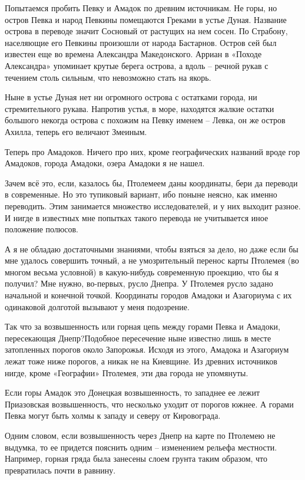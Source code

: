 Попытаемся пробить Певку и Амадок по древним источникам. Не горы, но остров Певка и народ Певкины помещаются Греками в устье Дуная. Название острова в переводе значит Сосновый от растущих на нем сосен. По Страбону, населяющие его Певкины произошли от народа Бастарнов. Остров сей был известен еще во времена Александра Македонского. Арриан в «Походе Александра» упоминает крутые берега острова, а вдоль – речной рукав с течением столь сильным, что невозможно стать на якорь.

Ныне в устье Дуная нет ни огромного острова с остатками города, ни стремительного рукава. Напротив устья, в море, находятся жалкие остатки большого некогда острова с похожим на Певку именем – Левка, он же остров Ахилла, теперь его величают Змеиным.

Теперь про Амадоков. Ничего про них, кроме географических названий вроде гор Амадоков, города Амадоки, озера Амадоки я не нашел.

Зачем всё это, если, казалось бы, Птолемеем даны координаты, бери да переводи в современные. Но это тупиковый вариант, ибо поныне неясно, как именно переводить. Этим занимается множество исследователей, и у них выходит разное. И нигде в известных мне попытках такого перевода не учитывается иное положение полюсов. 

А я не обладаю достаточными знаниями, чтобы взяться за дело, но даже если бы мне удалось совершить точный, а не умозрительный перенос карты Птолемея (во многом весьма условной) в какую-нибудь современную проекцию, что бы я получил? Мне нужно, во-первых, русло Днепра. У Птолемея русло задано начальной и конечной точкой. Координаты городов Амадоки и Азагориума с их одинаковой долготой вызывают у меня подозрение. 

Так что за возвышенность или горная цепь между горами Певка и Амадоки, пересекающая Днепр?Подобное пересечение ныне известно лишь в месте затопленных порогов около Запорожья. Исходя из этого, Амадока и Азагориум лежат тоже ниже порогов, а никак не на Киевщине. Из древних источников нигде, кроме «Географии» Птолемея, эти два города не упомянуты.

Если горы Амадок это Донецкая возвышенность, то западнее ее лежит Приазовская возвышенность, что несколько уходит от порогов южнее. А горами Певка могут быть холмы к западу и северу от Кировограда.

Одним словом, если возвышенность через Днепр на карте по Птолемею не выдумка, то ее придется пояснить одним – изменением рельефа местности. Например, горная гряда была занесены слоем грунта таким образом, что превратилась почти в равнину.

